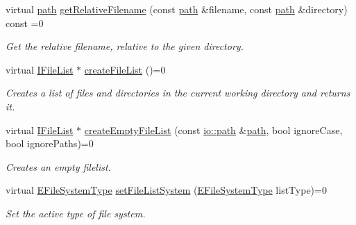\begin{DoxyCompactItemize}
\mbox{\label{classirr_1_1io_1_1IFileSystem_a9cb85c468a6cda253ff99c88010028c7}} 
virtual \hyperlink{namespaceirr_1_1io_a6468281622ce3a1c46b72e19f32dded5}{path} \hyperlink{classirr_1_1io_1_1IFileSystem_a9cb85c468a6cda253ff99c88010028c7}{get\+Relative\+Filename} (const \hyperlink{namespaceirr_1_1io_a6468281622ce3a1c46b72e19f32dded5}{path} \&filename, const \hyperlink{namespaceirr_1_1io_a6468281622ce3a1c46b72e19f32dded5}{path} \&directory) const =0
\begin{DoxyCompactList}\small\item\em Get the relative filename, relative to the given directory. \end{DoxyCompactList}\item 
virtual \hyperlink{classirr_1_1io_1_1IFileList}{I\+File\+List} $\ast$ \hyperlink{classirr_1_1io_1_1IFileSystem_ad5820e7664377c12015ea7a6c801f7f8}{create\+File\+List} ()=0
\begin{DoxyCompactList}\small\item\em Creates a list of files and directories in the current working directory and returns it. \end{DoxyCompactList}\item 
virtual \hyperlink{classirr_1_1io_1_1IFileList}{I\+File\+List} $\ast$ \hyperlink{classirr_1_1io_1_1IFileSystem_a4f8a69f557f2b7022f6cd7346c3e85d2}{create\+Empty\+File\+List} (const \hyperlink{namespaceirr_1_1io_a6468281622ce3a1c46b72e19f32dded5}{io\+::path} \&\hyperlink{namespaceirr_1_1io_a6468281622ce3a1c46b72e19f32dded5}{path}, bool ignore\+Case, bool ignore\+Paths)=0
\begin{DoxyCompactList}\small\item\em Creates an empty filelist. \end{DoxyCompactList}\item 
\mbox{\label{classirr_1_1io_1_1IFileSystem_a767614d727f0b1ec0bc5fdaaf906169b}} 
virtual \hyperlink{namespaceirr_1_1io_a22364f1caf06442a70f6198025af3fe9}{E\+File\+System\+Type} \hyperlink{classirr_1_1io_1_1IFileSystem_a767614d727f0b1ec0bc5fdaaf906169b}{set\+File\+List\+System} (\hyperlink{namespaceirr_1_1io_a22364f1caf06442a70f6198025af3fe9}{E\+File\+System\+Type} list\+Type)=0
\begin{DoxyCompactList}\small\item\em Set the active type of file system. \end{DoxyCompactList}\item 

\end{DoxyCompactItemize}
